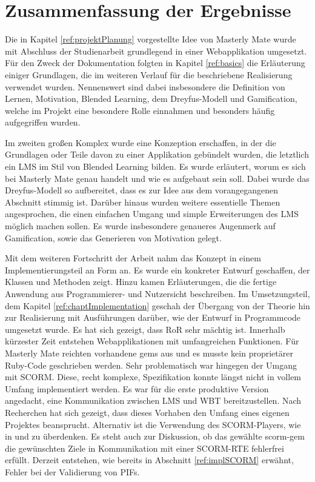 \chapter{Zusammenfassung der Ergebnisse}\label{ref:chaptConclusion}
Die in Kapitel \ref{ref:projektPlanung} vorgestellte Idee von Masterly Mate
wurde mit Abschluss der Studienarbeit grundlegend in einer Webapplikation
umgesetzt. Für den Zweck der Dokumentation folgten in Kapitel \ref{ref:basics}
die Erläuterung einiger Grundlagen, die im weiteren Verlauf für die beschriebene
Realisierung verwendet wurden. Nennenswert sind dabei insbesondere die
Definition von Lernen, Motivation, Blended Learning, dem Dreyfus-Modell und
Gamification, welche im Projekt eine besondere Rolle einnahmen und besonders
häufig aufgegriffen wurden.

Im zweiten großen Komplex wurde eine Konzeption erschaffen, in der die
Grundlagen oder Teile davon zu einer Applikation gebündelt wurden, die letztlich
ein LMS im Stil von Blended Learning bilden. Es wurde erläutert, worum es sich
bei Masterly Mate genau handelt und wie es aufgebaut sein soll. Dabei wurde das
Dreyfus-Modell so aufbereitet, dass es zur Idee aus dem vorangegangenen
Abschnitt stimmig ist. Darüber hinaus wurden weitere essentielle Themen
angesprochen, die einen einfachen Umgang und simple Erweiterungen des LMS
möglich machen sollen. Es wurde insbesondere genaueres Augenmerk auf
Gamification, sowie das Generieren von Motivation gelegt.

Mit dem weiteren Fortschritt der Arbeit nahm das Konzept in einem
Implementierungsteil an Form an. Es wurde ein konkreter Entwurf geschaffen, der
Klassen und Methoden zeigt. Hinzu kamen Erläuterungen, die die fertige Anwendung
aus Programmierer- und Nutzersicht beschreiben. Im Umsetzungsteil, dem Kapitel
\ref{ref:chaptImplementation} geschah der Übergang von der Theorie hin zur
Realisierung mit Ausführungen darüber, wie der Entwurf in Programmcode umgesetzt
wurde. Es hat sich gezeigt, dass \ac{RoR} sehr mächtig ist. Innerhalb kürzester
Zeit entstehen Webapplikationen mit umfangreichen Funktionen. Für Masterly Mate
reichten vorhandene gems aus und es musste kein proprietärer Ruby-Code
geschrieben werden. Sehr problematisch war hingegen der Umgang mit SCORM. Diese,
recht komplexe, Spezifikation konnte längst nicht in vollem Umfang implementiert
werden. Es war für die erste produktive Version angedacht, eine Kommunikation
zwischen \ac{LMS} und \ac{WBT} bereitzustellen. Nach Recherchen hat sich
gezeigt, dass dieses Vorhaben den Umfang eines eigenen Projektes beansprucht.
Alternativ ist die Verwendung des SCORM-Players, wie in \cite{mitter:2005} und
\cite{knall:2005} zu überdenken. Es steht auch zur Diskussion, ob das gewählte
scorm-gem die gewünschten Ziele in Kommunikation mit einer SCORM-RTE fehlerfrei
erfüllt. Derzeit entstehen, wie bereits in Abschnitt \ref{ref:implSCORM}
erwähnt, Fehler bei der Validierung von PIFs.\label{ref:problems}

